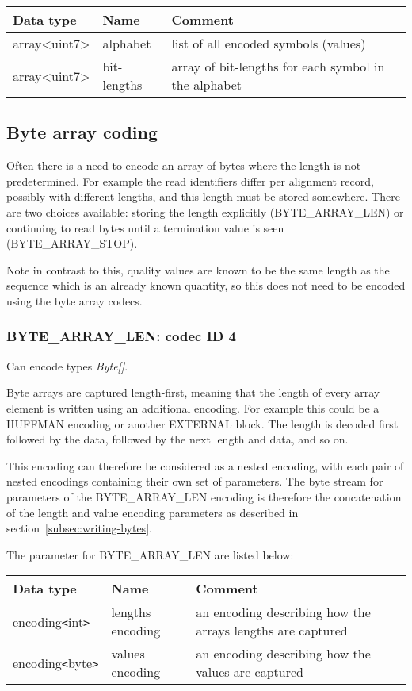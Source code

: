 \documentclass[a4paper]{article}
\begin{document}
\begin{tabular}{|>{\raggedright}p{100pt}|>{\raggedright}p{100pt}|>{\raggedright}p{230pt}|}
\hline
\textbf{Data type} & \textbf{Name} & \textbf{Comment}
\tabularnewline
\hline
array<uint7> & alphabet & list of all encoded symbols (values)\tabularnewline
\hline
array<uint7> & bit-lengths & array of bit-lengths for each symbol in the alphabet\tabularnewline
\hline
\end{tabular}

\subsection{Byte array coding}

Often there is a need to encode an array of bytes where the length is not predetermined.
For example the read identifiers differ per alignment record, possibly with different lengths, and this length must be stored somewhere.
There are two choices available: storing the length explicitly (BYTE\_ARRAY\_LEN) or continuing to read bytes until a termination value is seen (BYTE\_ARRAY\_STOP).

Note in contrast to this, quality values are known to be the same length as the sequence which is an already known quantity, so this does not need to be encoded using the byte array codecs.

\subsubsection*{BYTE\_ARRAY\_LEN: codec ID 4}

Can encode types \textit{Byte[]}.

Byte arrays are captured length-first, meaning that the length of every array element is written using an additional encoding.
For example this could be a HUFFMAN encoding or another EXTERNAL block.
The length is decoded first followed by the data, followed by the next length and data, and so on.

This encoding can therefore be considered as a nested encoding, with each pair of nested encodings containing their own set of parameters.
The byte stream for parameters of the BYTE\_ARRAY\_LEN encoding is therefore the concatenation of the length and value encoding parameters as described in section~\ref{subsec:writing-bytes}.

The parameter for BYTE\_ARRAY\_LEN are listed below:

\begin{tabular}{|>{\raggedright}p{100pt}|>{\raggedright}p{100pt}|>{\raggedright}p{230pt}|}
\hline
\textbf{Data type} & \textbf{Name} & \textbf{Comment}
\tabularnewline
\hline
encoding\texttt{<}int\texttt{>} & lengths encoding & an encoding describing how 
the arrays lengths are captured\tabularnewline
\hline
encoding\texttt{<}byte\texttt{>} & values encoding & an encoding describing how 
the values are captured\tabularnewline
\hline
\end{tabular}
\end{document}
